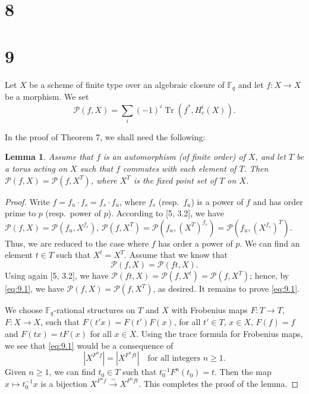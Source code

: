 \documentclass[12pt,a4paper]{article}
\theoremstyle{plain}
\newtheorem{lemma}{Lemma}[section]
\theoremstyle{remark}
\DeclareMathOperator{\Tr}{Tr}
\newcommand{\sP}{\mathcal{P}}
\begin{document}
\section*{8}

\section*{9}

Let $X$ be a scheme of finite type over an algebraic closure of $\mathbb{F}_q$ and let $f \colon X \to X$ be a morphism. We set
\begin{equation*}
\sP(f, X) = \sum_i (-1)^i \Tr(f^*, H_c^i(X)).
\end{equation*}

In the proof of Theorem 7, we shall need the following:

\begin{lemma}
Assume that $f$ is an automorphism (of finite order) of $X$, and let $T$ be a torus acting on $X$ such that $f$ commutes with each element of $T$. Then $\sP(f, X) = \sP(f, X^T)$, where $X^T$ is the fixed point set of $T$ on $X$.
\end{lemma}

\begin{proof}
Write $f = f_u \cdot f_s = f_s \cdot f_u$, where $f_s$ (resp.\ $f_u$) is a power of $f$ and has order prime to $p$ (resp.\ power of $p$). According to [5, 3.2], we have $\sP(f, X) = \sP(f_u, X^{f_s})$, $\sP(f, X^T) = \sP(f_u, (X^T)^{f_s}) = \sP(f_u, (X^{f_s})^T)$. Thus, we are reduced to the case where $f$ has order a power of $p$. We can find an element $t \in T$ such that $X^t = X^T$. Assume that we know that
\begin{equation}\label{eq:9.1}
\sP(f, X) = \sP(ft, X).
\end{equation}
Using again [5, 3.2], we have $\sP(ft, X) = \sP(f, X^t) = \sP(f, X^T)$; hence, by \eqref{eq:9.1}, we have $\sP(f, X) = \sP(f, X^T)$, as desired. It remains to prove \eqref{eq:9.1}.

We choose $\mathbb{F}_q$-rational structures on $T$ and $X$ with Frobenius maps $F \colon T \to T$, $F \colon X \to X$, such that $F(t'x) = F(t')F(x)$, for all $t' \in T$, $x \in X$, $F(f) = f$ and $F(tx) = tF(x)$ for all $x \in X$. Using the trace formula for Frobenius maps, we see that \eqref{eq:9.1} would be a consequence of
\begin{equation}\label{eq:9.2}
|X^{F^nf}| = |X^{F^nft}| \quad \text{for all integers } n \geq 1.
\end{equation}
Given $n \geq 1$, we can find $t_0 \in T$ such that $t_0^{-1}F^n(t_0) = t$. Then the map $x \mapsto t_0^{-1}x$ is a bijection $X^{F^nf} \xrightarrow{\sim} X^{F^nft}$. This completes the proof of the lemma.
\end{proof}
\end{document}
